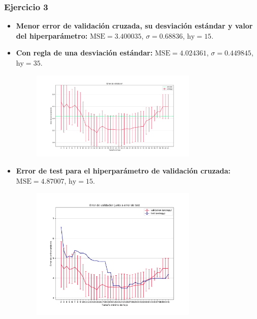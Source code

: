 \documentclass[11pt]{article}
\begin{document}
\subsubsection*{Ejercicio 3}

\begin{itemize}
    \item \textbf{Menor error de validación cruzada, su desviación estándar y valor del hiperparámetro:} $\text{MSE} = 3.400035$, $\sigma = 0.68836$, $\text{hy} = 15$.
    \item \textbf{Con regla de una desviación estándar:} $\text{MSE} = 4.024361$, $\sigma = 0.449845$, $\text{hy} = 35$.
    \begin{figure}[H]
    \centering
    \includegraphics[width=0.75\textwidth]{fotos/ej3_1.pdf}
    \end{figure}
    \item \textbf{Error de test para el hiperparámetro de validación cruzada:} $\text{MSE} = 4.87007$, $\text{hy} = 15$.
    \begin{figure}[H]
    \centering
    \includegraphics[width=0.75\textwidth]{fotos/ej3_2.pdf}
    \end{figure}
\end{itemize}
\end{document}
